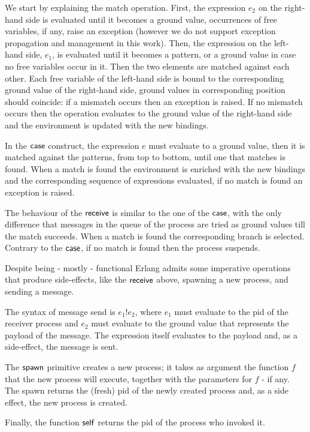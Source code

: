 \documentclass{article}[12pt,a4paper]
\theoremstyle{definition}
\begin{document}
We start by explaining the match operation. First, the expression $e_2$ on
the right-hand side is evaluated until it becomes a ground value,
occurrences of free variables, if any, raise an exception (however we do not support exception propagation and management in this work).
Then, the expression on the left-hand side, $e_1$, is evaluated until
it becomes a pattern, or a ground value in case no free variables
occur in it. Then the
two elements are matched against each other. Each free variable of the
left-hand side is bound to the corresponding ground value of the right-hand
side, ground values in corresponding position should coincide: if a mismatch occurs then an exception
is raised. If no mismatch occurs then the operation evaluates to the ground
value of the right-hand side and the environment is updated with the new bindings.

In the $\mathsf{case}$ construct, the expression $e$ must evaluate to a ground value, then it is matched against the patterns, from
top to bottom, until one that matches is found. When a match is found the environment
is enriched with the new bindings and the corresponding sequence of expressions evaluated, if
no match is found an exception is raised.

The behaviour of the $\mathsf{receive}$ is similar to the one of the
$\mathsf{case}$, with the only difference that messages in the queue of
the process are tried as ground values till the match succeeds.
When a match is found the corresponding branch
is selected.  Contrary to the $\mathsf{case}$, if no match is found
then the process suspends.

Despite being - mostly - functional Erlang
admits some imperative operations that produce side-effects, like the $\mathsf{receive}$
above, spawning a new process, and sending a message. 

The syntax of message send is $e_1!e_2$, where $e_1$ must
evaluate to the pid of the receiver process and $e_2$ must evaluate to the ground value that represents the payload of the message. The expression itself evaluates to
the payload and, as a side-effect, the message is sent.

The $\mathsf{spawn}$ primitive creates a new process; it takes as argument
the function $f$ that the new process will execute, together with the
parameters for $f$ - if any. The spawn returns the
(fresh) pid of the newly created process and, as a side effect, the new process is created.

Finally, the function $\mathsf{self}$ returns the pid of the process
who invoked it.
\end{document}
